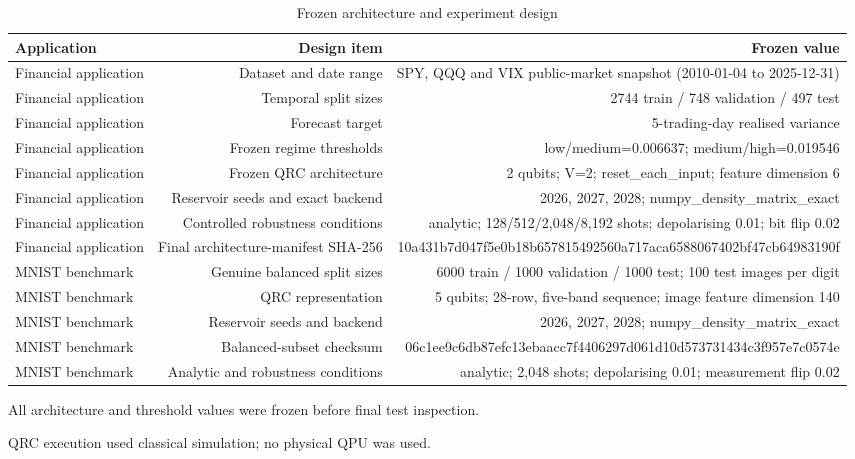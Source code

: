 \begin{table}[t]
\centering
\small
\caption{Frozen architecture and experiment design}
\begin{tabular}{lrr}
\toprule
Application & Design item & Frozen value \\
\midrule
Financial application & Dataset and date range & SPY, QQQ and VIX public-market snapshot (2010-01-04 to 2025-12-31) \\
Financial application & Temporal split sizes & 2744 train / 748 validation / 497 test \\
Financial application & Forecast target & 5-trading-day realised variance \\
Financial application & Frozen regime thresholds & low/medium=0.006637; medium/high=0.019546 \\
Financial application & Frozen QRC architecture & 2 qubits; V=2; reset\_each\_input; feature dimension 6 \\
Financial application & Reservoir seeds and exact backend & 2026, 2027, 2028; numpy\_density\_matrix\_exact \\
Financial application & Controlled robustness conditions & analytic; 128/512/2,048/8,192 shots; depolarising 0.01; bit flip 0.02 \\
Financial application & Final architecture-manifest SHA-256 & 10a431b7d047f5e0b18b657815492560a717aca6588067402bf47cb64983190f \\
MNIST benchmark & Genuine balanced split sizes & 6000 train / 1000 validation / 1000 test; 100 test images per digit \\
MNIST benchmark & QRC representation & 5 qubits; 28-row, five-band sequence; image feature dimension 140 \\
MNIST benchmark & Reservoir seeds and backend & 2026, 2027, 2028; numpy\_density\_matrix\_exact \\
MNIST benchmark & Balanced-subset checksum & 06c1ee9c6db87efc13ebaacc7f4406297d061d10d573731434c3f957e7c0574e \\
MNIST benchmark & Analytic and robustness conditions & analytic; 2,048 shots; depolarising 0.01; measurement flip 0.02 \\
\bottomrule
\end{tabular}
\parbox{0.98\linewidth}{\footnotesize All architecture and threshold values were frozen before final test inspection.}
\parbox{0.98\linewidth}{\footnotesize QRC execution used classical simulation; no physical QPU was used.}
\end{table}

